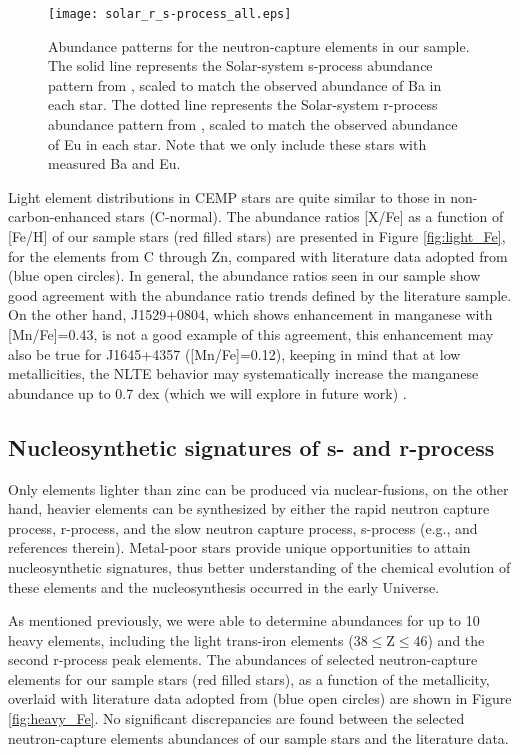 \begin{figure}[!ht]
\centering
\texttt{[image: solar\_r\_s-process\_all.eps]}
\caption{Abundance patterns for the neutron-capture elements in our sample. The solid line represents the Solar-system s-process abundance pattern from \citet{2000ApJ...544..302B}, scaled to match the observed abundance of Ba in each star. The dotted line represents the Solar-system r-process abundance pattern from \citet{2000ApJ...544..302B}, scaled to match the observed abundance of Eu in each star. Note that we only include these stars with measured Ba and Eu.}
\label{fig:patterns}
\end{figure}



Light element distributions in CEMP stars are quite similar to those in non-carbon-enhanced stars (C-normal). The abundance ratios [X/Fe]
as a function of [Fe/H] of our sample stars (red filled stars) are presented in Figure \ref{fig:light_Fe}, for the elements from C through Zn,
compared with literature data adopted from \citet{2013ApJ...762...26Y} (blue open circles). In general, the abundance ratios seen in our sample show good agreement
with the abundance ratio trends defined by the literature sample. On the other hand, J1529+0804, which shows enhancement
in manganese with [Mn/Fe]=0.43, is not a good example of this agreement, this enhancement may also be true for J1645+4357 ([Mn/Fe]=0.12), keeping in mind that
at low metallicities, the NLTE behavior may systematically increase the manganese abundance up to 0.7 dex (which we will explore in future work) \citep[e.g.,][]{2008A&A...492..823B}.
  
\subsection{Nucleosynthetic signatures of s- and r-process}

Only elements lighter than zinc can be produced via nuclear-fusions, on the other hand, heavier
elements can be synthesized by either the rapid neutron capture process, r-process, and the slow neutron capture process, s-process
(e.g., \citealt{1994ARA&A..32..153M, 2007PhR...450...97A} and references therein). Metal-poor stars provide unique opportunities to 
attain nucleosynthetic signatures, thus better understanding of the chemical evolution of
these elements and the nucleosynthesis occurred in the early Universe.


As mentioned previously, we were able to determine abundances for up to 10 heavy elements, including the light trans-iron elements ($38\leq$Z$\leq46$) and the second r-process peak elements. 
The abundances of selected neutron-capture elements for our sample stars (red filled stars), as a function of the metallicity, overlaid with literature data adopted from \citet{2007A&A...476..935F} (blue open circles) are shown in  Figure \ref{fig:heavy_Fe}. No significant discrepancies are found between the selected neutron-capture elements abundances of our sample stars and the literature data.

